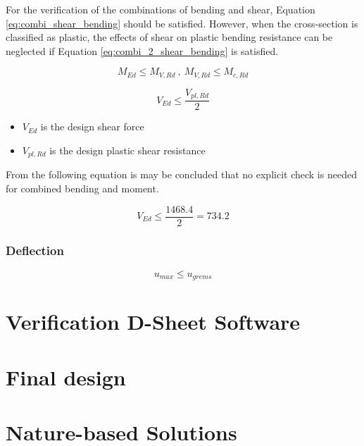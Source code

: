 For the verification of the combinations of bending and shear, Equation \ref{eq:combi_shear_bending} should be satisfied. However, when the cross-section is classified as plastic, the effects of shear on plastic bending resistance can be neglected if Equation \ref{eq:combi_2_shear_bending} is satisfied. 

\begin{equation}
    M_{Ed} \leq M_{V,Rd} \ , \ M_{V,Rd} \leq M_{c,Rd}
    \label{eq:combi_shear_bending}
\end{equation}

\begin{equation}
    V_{Ed} \leq \frac{V_{pl,Rd}}{2}
    \label{eq:combi_2_shear_bending}
\end{equation}

\begin{itemize}
  \item $V_{Ed}$ is the design shear force
  \item $V_{pl,Rd}$ is the design plastic shear resistance
\end{itemize}

From the following equation is may be concluded that no explicit check is needed for combined bending and moment. 

\begin{equation}
    V_{Ed} \leq \frac{1468.4}{2} = 734.2 
\end{equation}

\subsubsection{Deflection}

\begin{equation}
    u_{max} \leq u_{grems}
\end{equation}

\section{Verification D-Sheet Software}

\section{Final design}

\newpage

\section{Nature-based Solutions}

